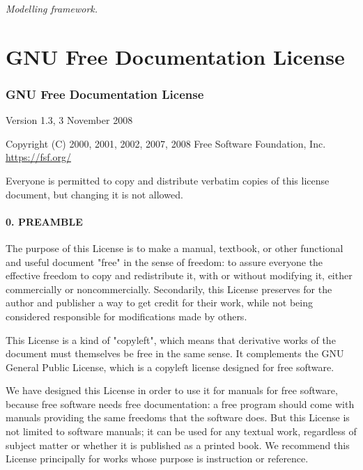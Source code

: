 \emph{Modelling framework.}

\hypertarget{gnu-free-documentation-license}{%
\section{GNU Free Documentation
License}\label{gnu-free-documentation-license}}

\hypertarget{gnu-free-documentation-license}{%
\subsubsection{GNU Free Documentation
License}\label{gnu-free-documentation-license}}

Version 1.3, 3 November 2008

Copyright (C) 2000, 2001, 2002, 2007, 2008 Free Software Foundation,
Inc. \url{https://fsf.org/}

Everyone is permitted to copy and distribute verbatim copies of this
license document, but changing it is not allowed.

\hypertarget{0-preamble}{%
\paragraph{0. PREAMBLE}\label{0-preamble}}

The purpose of this License is to make a manual, textbook, or other
functional and useful document "free" in the sense of freedom: to assure
everyone the effective freedom to copy and redistribute it, with or
without modifying it, either commercially or noncommercially.
Secondarily, this License preserves for the author and publisher a way
to get credit for their work, while not being considered responsible for
modifications made by others.

This License is a kind of "copyleft", which means that derivative works
of the document must themselves be free in the same sense. It
complements the GNU General Public License, which is a copyleft license
designed for free software.

We have designed this License in order to use it for manuals for free
software, because free software needs free documentation: a free program
should come with manuals providing the same freedoms that the software
does. But this License is not limited to software manuals; it can be
used for any textual work, regardless of subject matter or whether it is
published as a printed book. We recommend this License principally for
works whose purpose is instruction or reference.

